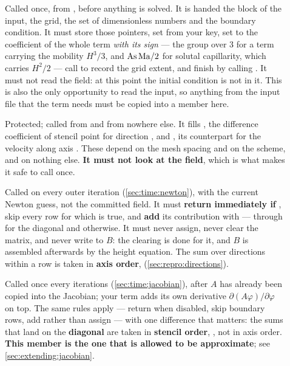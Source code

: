 \begin{description}

  \item[] Called once, from
    , before anything is solved. It
    is handed the  block of the input, the grid, the set of
    dimensionless numbers and the boundary condition. It must store those
    pointers, set  from your  key, set
     to the coefficient of the whole term \emph{with its
    sign} --- the group over 3 for a term carrying the mobility $H^{3}/3$, and
    $\mathrm{As}\,\mathrm{Ma}/2$ for solutal capillarity, which carries $H^{2}/2$ --- call
     to record the grid extent, and finish by calling
    . It must not read the field: at this point the
    initial condition is not in it. This is also the only opportunity to read
    the input, so anything from the input file that the term needs must be
    copied into a member here.

  \item[] Protected; called from  and from
    nowhere else. It fills , the difference coefficient of
    stencil point  for direction , and , its
    counterpart for the velocity along axis . These depend on the mesh
    spacing  and on the scheme, and on nothing else.
    \textbf{It must not look at the field}, which is what makes it safe to
    call once.

  \item[] Called on every outer iteration
    (\cref{sec:time:newton}), with  the current Newton guess, not
    the committed field. It must \textbf{return immediately if
    }, skip every row for which  is
    true, and \textbf{add} its contribution with \code{+=} --- through
     for the diagonal and 
    otherwise. It must never assign, never clear the matrix, and never write to
    $B$: the clearing is done for it, and $B$ is assembled afterwards by the
    height equation. The sum over directions within a row is taken in
    \textbf{axis order},  (\cref{sec:repro:directions}).

  \item[] Called once every
     iterations (\cref{sec:time:jacobian}),
    after $A$ has already been copied into the Jacobian; your term adds its own
    derivative $\partial(A\varphi)/\partial\varphi$ on top. The same rules
    apply --- return when disabled, skip boundary rows, add rather than assign
    --- with one difference that matters: the sums that land on the
    \textbf{diagonal} are taken in \textbf{stencil order},
    , not in axis order. \textbf{This member is the one
    that is allowed to be approximate}; see \cref{sec:extending:jacobian}.


\end{description}
